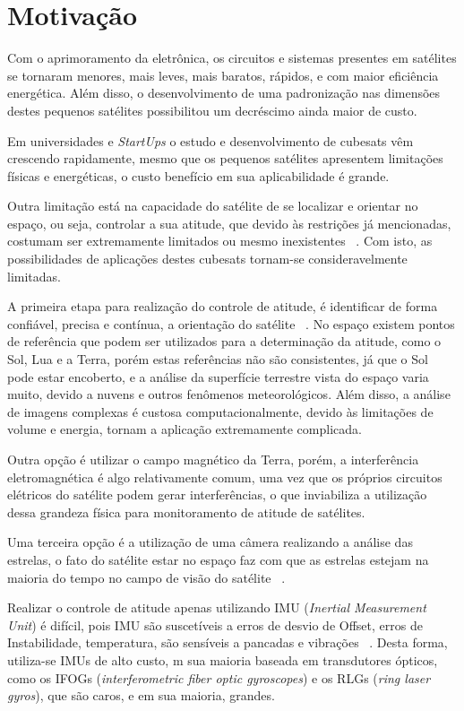 \section{Motivação}
\label{sec:Introducao_motivacao}
Com o aprimoramento da eletrônica, os circuitos e sistemas presentes em satélites se tornaram menores, mais leves, mais baratos, rápidos, e com maior eficiência  energética. Além disso, o desenvolvimento de uma padronização nas dimensões destes pequenos satélites possibilitou um decréscimo ainda maior de custo.

Em universidades e  \textit{StartUps} o estudo e desenvolvimento de cubesats vêm crescendo rapidamente, mesmo que os pequenos satélites apresentem limitações físicas e energéticas, o custo benefício em sua aplicabilidade é grande.

Outra limitação está na capacidade do satélite de se localizar e orientar no espaço, ou seja, controlar a sua atitude, que devido às restrições já mencionadas, costumam ser extremamente limitados ou mesmo inexistentes ~\cite[]{Diaz}. Com isto, as possibilidades de aplicações destes cubesats tornam-se consideravelmente limitadas.

A primeira etapa para realização do controle de atitude, é identificar de forma confiável, precisa e contínua, 
a orientação do satélite ~\cite[]{Diaz}. No espaço existem pontos de referência que podem ser utilizados para a determinação da atitude, 
como o Sol, Lua e a Terra, porém estas referências não são consistentes, já que o Sol pode estar encoberto, 
e a análise da superfície terrestre vista do espaço varia muito, devido a nuvens e outros fenômenos meteorológicos. 
Além disso, a análise de imagens complexas é custosa computacionalmente, 
devido às limitações de volume e energia, tornam a aplicação extremamente complicada.

Outra opção é utilizar o campo magnético da Terra, porém, a interferência eletromagnética é algo relativamente comum, 
uma vez que os próprios circuitos elétricos do satélite podem gerar interferências, 
o que inviabiliza a utilização dessa grandeza física para monitoramento de atitude de satélites.

Uma terceira opção é a utilização de uma câmera realizando a análise das estrelas, o fato do satélite estar no espaço faz com que as estrelas estejam na maioria do tempo no campo de visão do satélite ~\cite[]{Tappe}.

Realizar o controle de atitude apenas utilizando IMU (\textit{Inertial Measurement Unit})  é difícil, pois IMU são suscetíveis a erros de desvio de Offset, erros de Instabilidade, temperatura, são sensíveis a pancadas e vibrações ~\cite[]{Young}. 
Desta forma, utiliza-se IMUs de alto custo, m sua maioria baseada em transdutores ópticos, como os IFOGs (\textit{interferometric fiber optic gyroscopes}) e os RLGs (\textit{ring laser gyros}), 
que são caros, e em sua maioria, grandes. 

